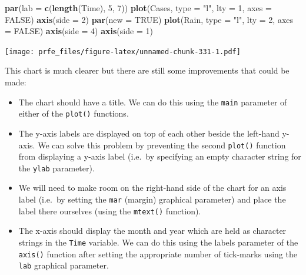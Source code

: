 \documentclass[12pt,a4paper]{book}
\newenvironment{Shaded}{\begin{snugshade}}{\end{snugshade}}
\newcommand{\KeywordTok}[1]{\textcolor[rgb]{0.13,0.29,0.53}{\textbf{#1}}}
\newcommand{\DataTypeTok}[1]{\textcolor[rgb]{0.13,0.29,0.53}{#1}}
\newcommand{\DecValTok}[1]{\textcolor[rgb]{0.00,0.00,0.81}{#1}}
\newcommand{\StringTok}[1]{\textcolor[rgb]{0.31,0.60,0.02}{#1}}
\newcommand{\OtherTok}[1]{\textcolor[rgb]{0.56,0.35,0.01}{#1}}
\newcommand{\NormalTok}[1]{#1}
\theoremstyle{definition}
\theoremstyle{definition}
\theoremstyle{definition}
\theoremstyle{remark}
\begin{document}
\begin{Shaded}
\begin{Highlighting}[]
\KeywordTok{par}\NormalTok{(}\DataTypeTok{lab =} \KeywordTok{c}\NormalTok{(}\KeywordTok{length}\NormalTok{(Time), }\DecValTok{5}\NormalTok{, }\DecValTok{7}\NormalTok{))}
\KeywordTok{plot}\NormalTok{(Cases, }\DataTypeTok{type =} \StringTok{"l"}\NormalTok{, }\DataTypeTok{lty =} \DecValTok{1}\NormalTok{, }\DataTypeTok{axes =} \OtherTok{FALSE}\NormalTok{)}
\KeywordTok{axis}\NormalTok{(}\DataTypeTok{side =} \DecValTok{2}\NormalTok{)}
\KeywordTok{par}\NormalTok{(}\DataTypeTok{new =} \OtherTok{TRUE}\NormalTok{)}
\KeywordTok{plot}\NormalTok{(Rain, }\DataTypeTok{type =} \StringTok{"l"}\NormalTok{, }\DataTypeTok{lty =} \DecValTok{2}\NormalTok{, }\DataTypeTok{axes =} \OtherTok{FALSE}\NormalTok{)}
\KeywordTok{axis}\NormalTok{(}\DataTypeTok{side =} \DecValTok{4}\NormalTok{)}
\KeywordTok{axis}\NormalTok{(}\DataTypeTok{side =} \DecValTok{1}\NormalTok{)}
\end{Highlighting}
\end{Shaded}

\texttt{[image: prfe\_files/figure-latex/unnamed-chunk-331-1.pdf]}

This chart is much clearer but there are still some improvements that
could be made:

\begin{itemize}
\item
  The chart should have a title. We can do this using the \texttt{main}
  parameter of either of the \texttt{plot()} functions.
\item
  The y-axis labels are displayed on top of each other beside the
  left-hand y-axis. We can solve this problem by preventing the second
  \texttt{plot()} function from displaying a y-axis label (i.e.~by
  specifying an empty character string for the \texttt{ylab} parameter).
\item
  We will need to make room on the right-hand side of the chart for an
  axis label (i.e.~by setting the \texttt{mar} (margin) graphical
  parameter) and place the label there ourselves (using the
  \texttt{mtext()} function).
\item
  The x-axis should display the month and year which are held as
  character strings in the \texttt{Time} variable. We can do this using
  the labels parameter of the \texttt{axis()} function after setting the
  appropriate number of tick-marks using the \texttt{lab} graphical
  parameter.
\end{itemize}
\end{document}

